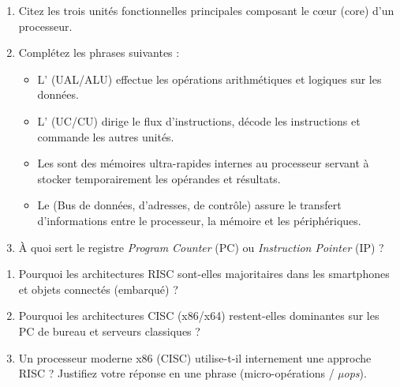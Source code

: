 \documentclass[11pt]{article}
\begin{document}
\begin{exercice}
\begin{enumerate}
    \item Citez les trois unités fonctionnelles principales composant le cœur (core) d'un processeur.
    \item Complétez les phrases suivantes :
    \begin{itemize}
        \item[a)] L'\underline{\hspace{5cm}} (UAL/ALU) effectue les opérations arithmétiques et logiques sur les données.
        \item[b)] L'\underline{\hspace{5cm}} (UC/CU) dirige le flux d'instructions, décode les instructions et commande les autres unités.
        \item[c)] Les \underline{\hspace{5cm}} sont des mémoires ultra-rapides internes au processeur servant à stocker temporairement les opérandes et résultats.
        \item[d)] Le \underline{\hspace{5cm}} (Bus de données, d'adresses, de contrôle) assure le transfert d'informations entre le processeur, la mémoire et les périphériques.
    \end{itemize}
    \item À quoi sert le registre \textit{Program Counter} (PC) ou \textit{Instruction Pointer} (IP) ?
\end{enumerate}
\end{exercice}

\begin{exercice}
\begin{enumerate}
    \item Pourquoi les architectures RISC sont-elles majoritaires dans les smartphones et objets connectés (embarqué) ?
    \item Pourquoi les architectures CISC (x86/x64) restent-elles dominantes sur les PC de bureau et serveurs classiques ?
    \item Un processeur moderne x86 (CISC) utilise-t-il internement une approche RISC ? Justifiez votre réponse en une phrase (micro-opérations / \textit{µops}).
\end{enumerate}
\end{exercice}
\end{document}
